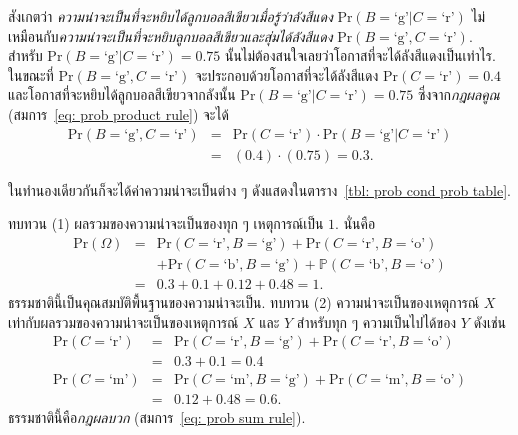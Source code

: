 สังเกตว่า \textit{ความน่าจะเป็นที่จะหยิบได้ลูกบอลสีเขียวเมื่อรู้ว่าลังสีแดง} $\mathrm{Pr}(B = \mbox{`g'}|C = \mbox{`r'})$ ไม่เหมือนกับ\textit{ความน่าจะเป็นที่จะหยิบลูกบอลสีเขียวและสุ่มได้ลังสีแดง} $\mathrm{Pr}(B = \mbox{`g'}, C = \mbox{`r'})$.
สำหรับ
$\mathrm{Pr}(B = \mbox{`g'}|C = \mbox{`r'}) = 0.75$
นั้นไม่ต้องสนใจเลยว่าโอกาสที่จะได้ลังสีแดงเป็นเท่าไร.
ในขณะที่
$\mathrm{Pr}(B = \mbox{`g'}, C = \mbox{`r'})$ จะประกอบด้วยโอกาสที่จะได้ลังสีแดง $\mathrm{Pr}(C = \mbox{`r'}) = 0.4$ และโอกาสที่จะหยิบได้ลูกบอลสีเขียวจากลังนั้น $\mathrm{Pr}(B = \mbox{`g'}|C = \mbox{`r'}) = 0.75$
ซึ่งจาก\textit{กฎผลคูณ} (สมการ~\ref{eq: prob product rule})
จะได้
\begin{eqnarray}
\mathrm{Pr}(B = \mbox{`g'}, C = \mbox{`r'}) &=& \mathrm{Pr}(C = \mbox{`r'}) \cdot \mathrm{Pr}(B = \mbox{`g'}|C = \mbox{`r'})
\nonumber \\
&=& (0.4) \cdot (0.75) = 0.3
\nonumber .
\end{eqnarray}

ในทำนองเดียวกันก็จะได้ค่าความน่าจะเป็นต่าง ๆ
ดังแสดงในตาราง~\ref{tbl: prob cond prob table}.

ทบทวน (1) ผลรวมของความน่าจะเป็นของทุก ๆ เหตุการณ์เป็น $1$. 
นั่นคือ
\begin{eqnarray}
\mathrm{Pr}(\Omega) &=& \mathrm{Pr}(C = \mbox{`r'}, B = \mbox{`g'})
+ \mathrm{Pr}(C = \mbox{`r'}, B = \mbox{`o'})
\nonumber \\
&\;&  
+ \mathrm{Pr}(C = \mbox{`b'}, B = \mbox{`g'})
+ \mathbb{P}(C = \mbox{`b'}, B = \mbox{`o'})    
\nonumber \\
&=& 0.3 + 0.1 + 0.12 + 0.48 = 1
\nonumber .
\end{eqnarray}
ธรรมชาตินี้เป็นคุณสมบัติพื้นฐานของความน่าจะเป็น.
ทบทวน (2) ความน่าจะเป็นของเหตุการณ์ $X$ เท่ากับผลรวมของความน่าจะเป็นของเหตุการณ์ $X$ และ $Y$ สำหรับทุก ๆ ความเป็นไปได้ของ $Y$ 
ดังเช่น
\begin{eqnarray}
\mathrm{Pr}(C = \mbox{`r'}) &=& \mathrm{Pr}(C = \mbox{`r'}, B = \mbox{`g'}) + \mathrm{Pr}(C = \mbox{`r'}, B = \mbox{`o'})
\nonumber \\
&=& 0.3 + 0.1 = 0.4
\nonumber \\
\mathrm{Pr}(C = \mbox{`m'}) &=& \mathrm{Pr}(C = \mbox{`m'}, B = \mbox{`g'}) + \mathrm{Pr}(C = \mbox{`m'}, B = \mbox{`o'})
\nonumber \\
&=& 0.12 + 0.48 = 0.6
\nonumber .
\end{eqnarray}
ธรรมชาตินี้คือ\textit{กฎผลบวก} (สมการ~\ref{eq: prob sum rule}).

